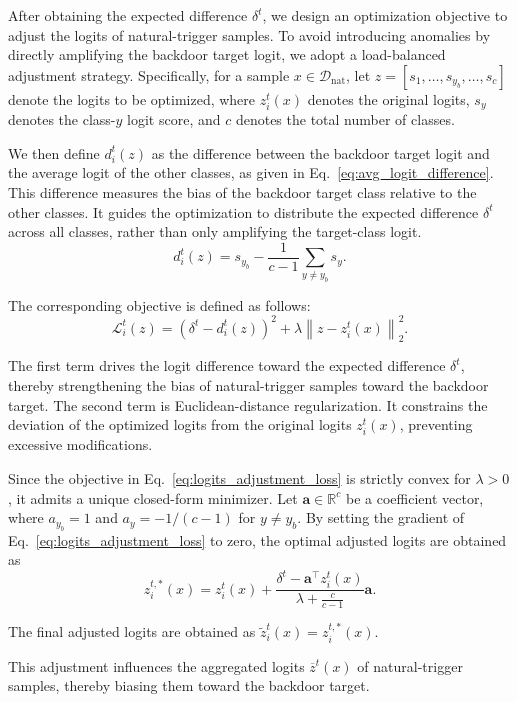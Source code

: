 \documentclass[lettersize,journal]{IEEEtran}
\newif\ifhighlight
\newcommand{\hlthree}[1]{%
    \ifhighlight{\color{reviewer3}#1}\else#1\fi
}
\begin{document}
\hlthree{After obtaining the expected difference $\delta^t$, we design an optimization objective to adjust the logits of natural-trigger samples.
To avoid introducing anomalies by directly amplifying the backdoor target logit, we adopt a load-balanced adjustment strategy.
Specifically, for a sample $x\in\mathcal{D}_{\mathrm{nat}}$, let $z=[s_1,\dots,s_{y_b},\dots,s_c]$ denote the logits to be optimized, where $z_i^t(x)$ denotes the original logits, $s_y$ denotes the class-$y$ logit score, and $c$ denotes the total number of classes.

We then define $d_i^t(z)$ as the difference between the backdoor target logit and the average logit of the other classes, as given in Eq.~\ref{eq:avg_logit_difference}.
This difference measures the bias of the backdoor target class relative to the other classes.
It guides the optimization to distribute the expected difference \(\delta^t\) across all classes, rather than only amplifying the target-class logit.
\begin{equation}
d_i^t(z)
=
s_{y_b}
-
\frac{1}{c-1}
\sum_{y\neq y_b}s_y.
\label{eq:avg_logit_difference}
\end{equation}

The corresponding objective is defined as follows:
\begin{equation}
\mathcal{L}_i^t(z)
=
\left(\delta^t-d_i^t(z)\right)^2
+
\lambda\left\|z-z_i^t(x)\right\|_2^2.
\label{eq:logits_adjustment_loss}
\end{equation}

The first term drives the logit difference toward the expected difference \(\delta^t\), thereby strengthening the bias of natural-trigger samples toward the backdoor target.
The second term is Euclidean-distance regularization.
It constrains the deviation of the optimized logits from the original logits $z_i^t(x)$, preventing excessive modifications.

Since the objective in Eq.~\ref{eq:logits_adjustment_loss} is strictly convex for $\lambda>0$, it admits a unique closed-form minimizer.
Let $\mathbf{a}\in\mathbb{R}^c$ be a coefficient vector, where $a_{y_b}=1$ and $a_y=-1/(c-1)$ for $y\neq y_b$. 
By setting the gradient of Eq.~\ref{eq:logits_adjustment_loss} to zero, the optimal adjusted logits are obtained as
\begin{equation}
z_i^{t,*}(x)
=
z_i^t(x)
+
\frac{
\delta^t-\mathbf{a}^{\top}z_i^t(x)
}{
\lambda+\frac{c}{c-1}
}\mathbf{a}.
\label{eq:closed_form_logits}
\end{equation}
}
\hlthree{The final adjusted logits are obtained as $\widetilde{z}_i^t(x)=z_i^{t,*}(x)$.}
This adjustment influences the aggregated logits \(\overline{z}^t(x)\) of natural-trigger samples, thereby biasing them toward the backdoor target.
\end{document}
